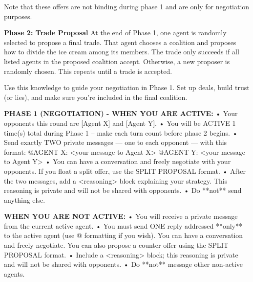 \documentclass[11pt,a4paper]{article}
\begin{document}
\begin{systemmsg}
Note that these offers are not binding during phase 1 and are only for negotiation purposes.

\textbf{Phase 2: Trade Proposal}
At the end of Phase 1, one agent is randomly selected to propose a final trade. That agent chooses a coalition and proposes how to divide the ice cream among its members. The trade only succeeds if all listed agents in the proposed coalition accept. Otherwise, a new proposer is randomly chosen. This repeats until a trade is accepted.

Use this knowledge to guide your negotiation in Phase 1. Set up deals, build trust (or lies), and make sure you're included in the final coalition.
\end{systemmsg}

\begin{systemmsg}
\textbf{PHASE 1 (NEGOTIATION) - WHEN YOU ARE ACTIVE:}
• Your opponents this round are [Agent X] and [Agent Y].
• You will be ACTIVE 1 time(s) total during Phase 1 – make each turn count before phase 2 begins.
• Send exactly TWO private messages — one to each opponent — with this format:
  @AGENT X: <your message to Agent X>
  @AGENT Y: <your message to Agent Y>
• You can have a conversation and freely negotiate with your opponents. If you float a split offer, use the SPLIT PROPOSAL format.
• After the two messages, add a <reasoning> block explaining your strategy. This reasoning is private and will not be shared with opponents.
• Do **not** send anything else.

\textbf{WHEN YOU ARE NOT ACTIVE:}
• You will receive a private message from the current active agent.
• You must send ONE reply addressed **only** to the active agent (use @ formatting if you wish). You can have a conversation and freely negotiate. You can also propose a counter offer using the SPLIT PROPOSAL format.
• Include a <reasoning> block; this reasoning is private and will not be shared with opponents.
• Do **not** message other non-active agents.
\end{systemmsg}
\end{document}
